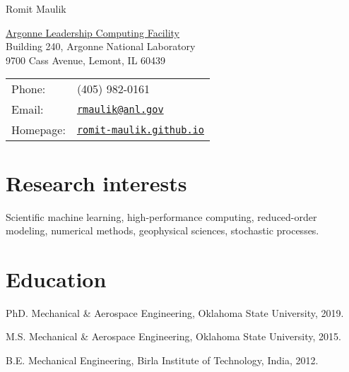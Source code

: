 \documentclass[letterpaper]{article}
\def\name{Romit Maulik}
\renewenvironment{itemize}{
  \begin{list}{}{
    \setlength{\leftmargin}{1.5em}
  }
}{
  \end{list}
}
\begin{document}
{\huge \name}


\vspace{0.25in}

\begin{minipage}{0.45\linewidth}
  \href{http://www.mcs.anl.gov/}{Argonne Leadership Computing Facility} \\
  Building 240, Argonne National Laboratory \\
  9700 Cass Avenue, Lemont, IL 60439
\end{minipage}
\begin{minipage}{0.45\linewidth}
  \begin{tabular}{ll}
    Phone: & (405) 982-0161 \\
    Email: & \href{mailto:rmaulik@anl.gov}{\tt rmaulik@anl.gov} \\
    Homepage: & \href{https://romit-maulik.github.io/}{\tt romit-maulik.github.io} \\
  \end{tabular}
\end{minipage}

\section*{Research interests}

Scientific machine learning, high-performance computing, reduced-order modeling, numerical methods, geophysical sciences, stochastic processes.

\section*{Education}

\begin{itemize}
  \item PhD. Mechanical \& Aerospace Engineering, Oklahoma State University, 2019.
  \item M.S. Mechanical \& Aerospace Engineering, Oklahoma State University, 2015.
  \item B.E. Mechanical Engineering, Birla Institute of Technology, India, 2012. 
\end{itemize}
\end{document}
